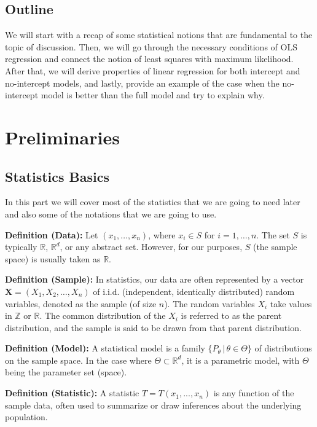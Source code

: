 \documentclass[12pt,a4paper,oneside]{book} %
\begin{document}
	\section{Outline}
	We will start with a recap of some statistical notions that are fundamental to the topic of discussion. Then, we will go through the necessary conditions of OLS regression and connect the notion of least squares with maximum likelihood. After that, we will derive properties of linear regression for both intercept and no-intercept models, and lastly, provide an example of the case when the no-intercept model is better than the full model and try to explain why.
	
	\chapter{Preliminaries}


	\section{Statistics Basics}
	
	In this part we will cover most of the statistics that we are going to need later and also some of the notations that we are going to use.
	
	

\textbf{Definition (Data):} Let $(x_1, \ldots, x_n)$, where $x_i \in S$ for $i = 1, \ldots, n$. The set $S$ is typically $\mathbb{R}$, $\mathbb{R}^d$, or any abstract set. However, for our purposes, $S$ (the sample space) is usually taken as $\mathbb{R}$.

\textbf{Definition (Sample):} In statistics, our data are often represented by a vector $\mathbf{X} = (X_1, X_2, \ldots, X_n)$ of i.i.d. (independent, identically distributed) random variables, denoted as the sample (of size $n$). The random variables $X_i$ take values in $\mathbb{Z}$ or $\mathbb{R}$. The common distribution of the $X_i$ is referred to as the parent distribution, and the sample is said to be drawn from that parent distribution.

\textbf{Definition (Model):} A statistical model is a family $\{P_{\theta} \,|\, \theta \in \Theta\}$ of distributions on the sample space. In the case where $\Theta \subset \mathbb{R}^d$, it is a parametric model, with $\Theta$ being the parameter set (space).

\textbf{Definition (Statistic):} A statistic $T=T(x_1,...,x_n )$ is any function of the sample data, often used to summarize or draw inferences about the underlying population.
\end{document}
